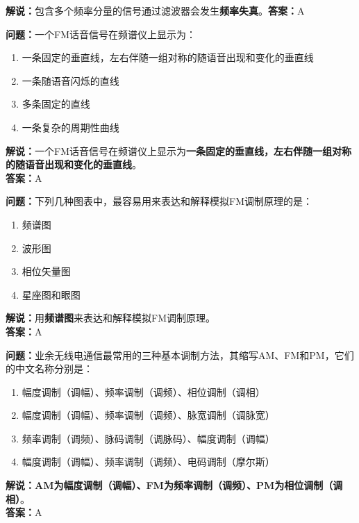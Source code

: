 \textbf{解说：}包含多个频率分量的信号通过滤波器会发生\textbf{频率失真}。\textbf{答案：}A%



\textbf{问题：}一个FM话音信号在频谱仪上显示为：

\begin{enumerate}[label=\Alph*), leftmargin=1cm]
	\item 一条固定的垂直线，左右伴随一组对称的随语音出现和变化的垂直线
	\item 一条随语音闪烁的直线
	\item 多条固定的直线
	\item 一条复杂的周期性曲线
\end{enumerate}

\textbf{解说：}一个FM话音信号在频谱仪上显示为\textbf{一条固定的垂直线，左右伴随一组对称的随语音出现和变化的垂直线}。\\\textbf{答案：}A%



\textbf{问题：}下列几种图表中，最容易用来表达和解释模拟FM调制原理的是：

\begin{enumerate}[label=\Alph*), leftmargin=1cm]
	\item 频谱图
	\item 波形图
	\item 相位矢量图
	\item 星座图和眼图
\end{enumerate}

\textbf{解说：}用\textbf{频谱图}来表达和解释模拟FM调制原理。\\\textbf{答案：}A%



\textbf{问题：}业余无线电通信最常用的三种基本调制方法，其缩写AM、FM和PM，它们的中文名称分别是：

\begin{enumerate}[label=\Alph*), leftmargin=1cm]
	\item 幅度调制（调幅）、频率调制（调频）、相位调制（调相）
	\item 幅度调制（调幅）、频率调制（调频）、脉宽调制（调脉宽）
	\item 频率调制（调频）、脉码调制（调脉码）、幅度调制（调幅）
	\item 幅度调制（调幅）、频率调制（调频）、电码调制（摩尔斯）
\end{enumerate}

\textbf{解说：}\textbf{AM为幅度调制（调幅）、FM为频率调制（调频）、PM为相位调制（调相）}。\\\textbf{答案：}A%



